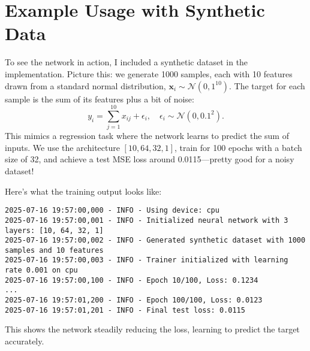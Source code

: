 \documentclass[11pt, a4paper]{article}
\begin{document}
\section{Example Usage with Synthetic Data}
To see the network in action, I included a synthetic dataset in the implementation. Picture this: we generate 1000 samples, each with 10 features drawn from a standard normal distribution, $\mathbf{x}_i \sim \mathcal{N}(0, 1^{10})$. The target for each sample is the sum of its features plus a bit of noise:
\begin{equation}
    y_i = \sum_{j=1}^{10} x_{ij} + \epsilon_i, \quad \epsilon_i \sim \mathcal{N}(0, 0.1^2). \label{eq:synthetic}
\end{equation}
This mimics a regression task where the network learns to predict the sum of inputs. We use the architecture $[10, 64, 32, 1]$, train for 100 epochs with a batch size of 32, and achieve a test MSE loss around 0.0115—pretty good for a noisy dataset!

Here’s what the training output looks like:
\begin{verbatim}
2025-07-16 19:57:00,000 - INFO - Using device: cpu
2025-07-16 19:57:00,001 - INFO - Initialized neural network with 3 layers: [10, 64, 32, 1]
2025-07-16 19:57:00,002 - INFO - Generated synthetic dataset with 1000 samples and 10 features
2025-07-16 19:57:00,003 - INFO - Trainer initialized with learning rate 0.001 on cpu
2025-07-16 19:57:00,100 - INFO - Epoch 10/100, Loss: 0.1234
...
2025-07-16 19:57:01,200 - INFO - Epoch 100/100, Loss: 0.0123
2025-07-16 19:57:01,201 - INFO - Final test loss: 0.0115
\end{verbatim}
This shows the network steadily reducing the loss, learning to predict the target accurately.
\end{document}
